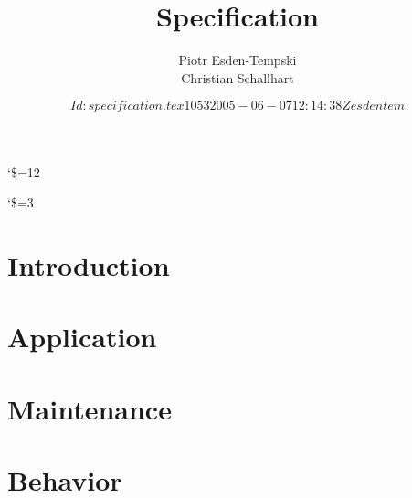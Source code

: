 \documentclass[a4paper, 12pt]{book}
\begin{document}
\title{\SYNEIGHTLOGO\\\vspace{1cm}Specification}
\author{Piotr Esden-Tempski\\ Christian Schallhart}
\catcode`\$=12
\date{\texttt{$Id: specification.tex 1053 2005-06-07 12:14:38Z esdentem $}}
\catcode`\$=3
\maketitle
\tableofcontents

\newpage

\part{Introduction}







\part{Application}






\part{Maintenance}





\part{Behavior}




\end{document}
